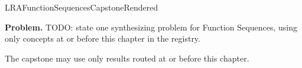 \ifcsname LRAFunctionSequencesCapstoneRendered\endcsname
\else
\expandafter\gdef\csname LRAFunctionSequencesCapstoneRendered\endcsname{}

\newpage
{}
\label{cap:function-sequences}

\begin{tcolorbox}[
  colback=gray!6,
  colframe=gray!40,
  arc=2pt,
  left=8pt, right=8pt, top=6pt, bottom=6pt,
  title={\small\textbf{Capstone Problem}},
  fonttitle=\small\bfseries
]
\textbf{Problem.}
TODO: state one synthesizing problem for Function Sequences, using only concepts at or
before this chapter in the registry.
\end{tcolorbox}

\begin{remark*}
The capstone may use only results routed at or before this chapter.
\end{remark*}

\clearpage
\fi
